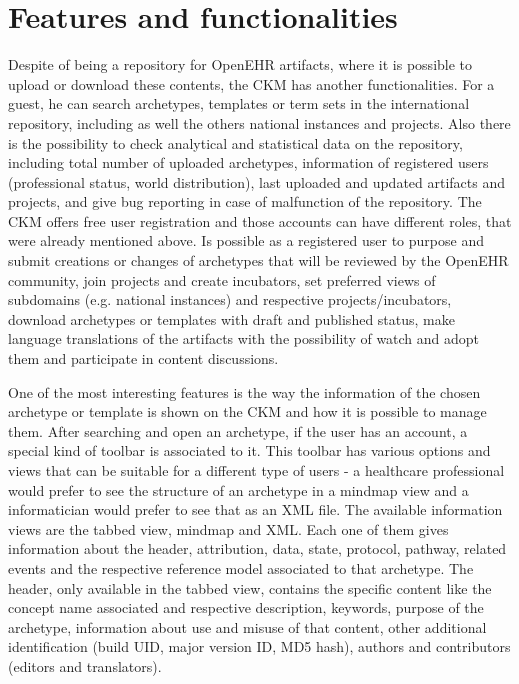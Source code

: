 \documentclass[mim_thesis.tex]{subfiles}
\begin{document}
\section{Features and functionalities}
Despite of being a repository for OpenEHR artifacts, where it is possible to upload or download these contents, the CKM has another functionalities. For a guest, he can search archetypes, templates or term sets in the international repository, including as well the others national instances and projects. Also there is the possibility to check analytical and statistical data on the repository, including total number of uploaded archetypes, information of registered users (professional status, world distribution), last uploaded and updated artifacts and projects, and give bug reporting in case of malfunction of the repository. The CKM offers free user registration and those accounts can have different roles, that were already mentioned above. Is possible as a registered user to purpose and submit creations or changes of archetypes that will be reviewed by the OpenEHR community, join projects and create incubators, set preferred views of subdomains (e.g. national instances) and respective projects/incubators, download archetypes or templates with draft and published status, make language translations of the artifacts with the possibility of watch and adopt them and participate in content discussions. 

One of the most interesting features is the way the information of the chosen archetype or template is shown on the CKM and how it is possible to manage them. After searching and open an archetype, if the user has an account, a special kind of toolbar is associated to it. This toolbar has various options and views that can be suitable for a different type of users - a healthcare professional would prefer to see the structure of an archetype in a mindmap view and a informatician would prefer to see that as an XML file. The available information views are the tabbed view, mindmap and XML. Each one of them gives information about the header, attribution, data, state, protocol, pathway, related events and the respective reference model associated to that archetype. The header, only available in the tabbed view, contains the specific content like the concept name associated and respective description, keywords, purpose of the archetype, information about use and misuse of that content, other additional identification (build UID, major version ID, MD5 hash), authors and contributors (editors and translators). 
\end{document}
